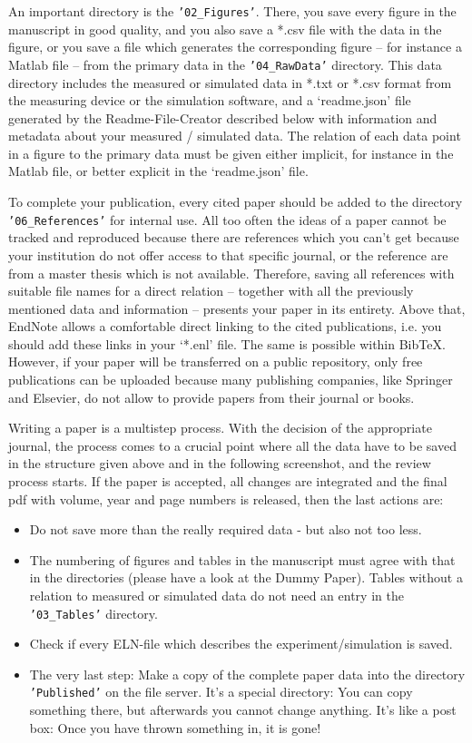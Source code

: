 An important directory is the \texttt{'02\_Figures'}. There, you save every figure
in the manuscript in good quality, and you also save a *.csv file with the data
in the figure, or you save a file which generates the corresponding figure –
for instance a Matlab file – from the primary data in the \texttt{'04\_RawData'}
directory. This data directory includes the measured or simulated data in *.txt
or *.csv format from the measuring device or the simulation software, and a
`readme.json' file generated by the Readme-File-Creator described below with
information and metadata about your measured / simulated data. The relation of
each data point in a figure to the primary data must be given either implicit,
for instance in the Matlab file, or better explicit in the `readme.json' file.

To complete your publication, every cited paper should be added to the directory\\
\texttt{'06\_References'} for internal use. All too often the ideas of a paper
cannot be tracked and reproduced because there are references which you can’t
get because your institution do not offer access to that specific journal, or
the reference are from a master thesis which is not available. Therefore, saving
all references with suitable file names for a direct relation – together with
all the previously mentioned data and information – presents your paper in its
entirety. Above that, EndNote allows a comfortable direct linking to the cited
publications, i.e. you should add these links in your ‘*.enl’ file. The same is
possible within BibTeX. However, if your paper will be transferred on a public
repository, only free publications can be uploaded because many publishing
companies, like Springer and Elsevier, do not allow to provide papers from their
journal or books.

Writing a paper is a multistep process. With the decision of the appropriate
journal, the process comes to a crucial point where all the data have to be
saved in the structure given above and in the following screenshot, and the
review process starts. If the paper is accepted, all changes are integrated
and the final pdf with volume, year and page numbers is released, then the last
actions are:
\begin{itemize}
  \item Do not save more than the really required data - but also not too less.
  \item The numbering of figures and tables in the manuscript must agree with that
        in the directories (please have a look at the Dummy Paper). Tables without
        a relation to measured or simulated data do not need an entry in the
        \texttt{'03\_Tables'} directory.
  \item Check if every ELN-file which describes the experiment/simulation
        is saved.
  \item The very last step: Make a copy of the complete paper data into the
        directory \texttt{’Published’} on the file server. It’s a special
        directory: You can copy something there, but afterwards you cannot
        change anything. It’s like a post box: Once you have thrown something
        in, it is gone!
\end{itemize}

